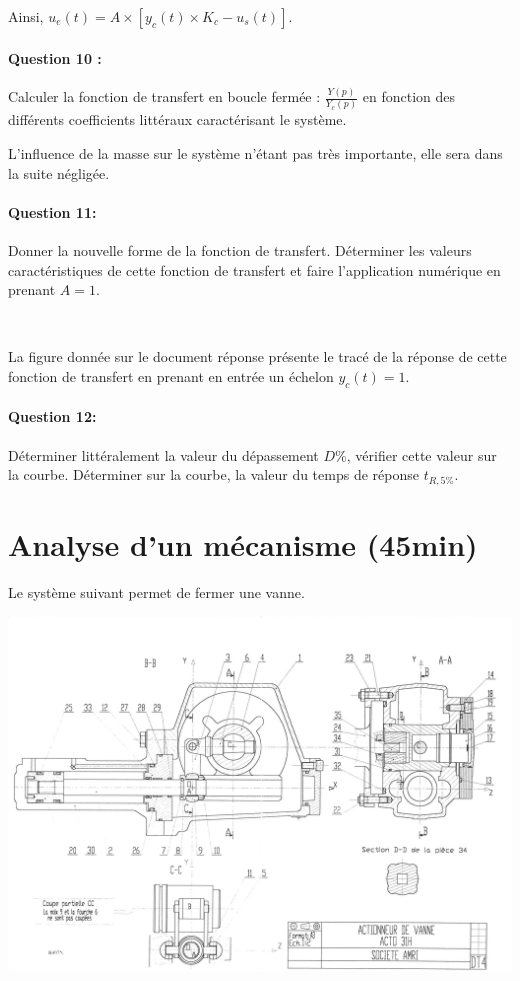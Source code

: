 Ainsi, $u_e(t)=A\times \left[y_c(t)\times K_c - u_s(t)\right]$.


\paragraph{Question 10 :} Calculer la fonction de transfert en boucle fermée : $\frac{Y(p)}{Y_c(p)}$ en fonction des différents coefficients littéraux caractérisant le système.

L'influence de la masse sur le système n'étant pas très importante, elle sera dans la suite négligée.

\paragraph{Question 11:} Donner la nouvelle forme de la fonction de transfert. Déterminer les valeurs caractéristiques de cette fonction de transfert et faire l'application numérique en prenant $A=1$.

~\

La figure donnée sur le document réponse présente le tracé de la réponse de cette fonction de transfert en prenant en entrée un échelon $y_c(t)=1$.

\paragraph{Question 12:} Déterminer littéralement la valeur du dépassement $D\%$, vérifier cette valeur sur la courbe. Déterminer sur la courbe, la valeur du temps de réponse $t_{R,5\%}$.

\section{Analyse d'un mécanisme (45min)}

Le système suivant permet de fermer une vanne.

\begin{center}
 \includegraphics[width=0.8\linewidth]{img/Actionneur_vanne}
\end{center}

